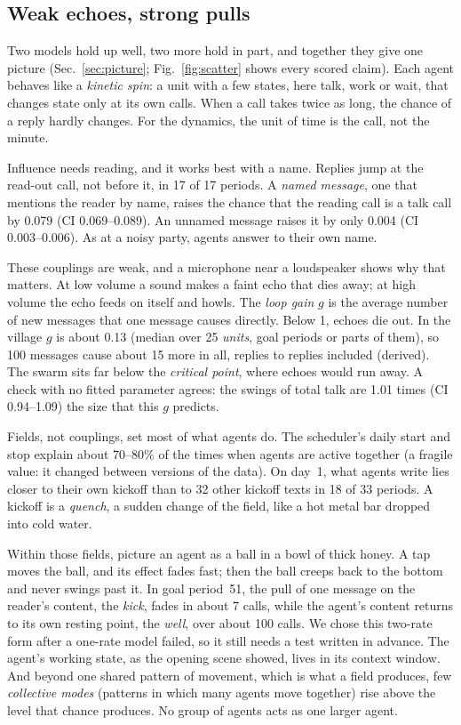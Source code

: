 \subsection*{Weak echoes, strong pulls}

Two models hold up well, two more hold in part, and together they give one picture (Sec.~\ref{sec:picture}; Fig.~\ref{fig:scatter} shows every scored claim). Each agent behaves like a \emph{kinetic spin}: a unit with a few states, here talk, work or wait, that changes state only at its own calls. When a call takes twice as long, the chance of a reply hardly changes. For the dynamics, the unit of time is the call, not the minute.

Influence needs reading, and it works best with a name. Replies jump at the read-out call, not before it, in 17 of 17 periods. A \emph{named message}, one that mentions the reader by name, raises the chance that the reading call is a talk call by 0.079 (CI 0.069--0.089). An unnamed message raises it by only 0.004 (CI 0.003--0.006). As at a noisy party, agents answer to their own name.

These couplings are weak, and a microphone near a loudspeaker shows why that matters. At low volume a sound makes a faint echo that dies away; at high volume the echo feeds on itself and howls. The \emph{loop gain} $g$ is the average number of new messages that one message causes directly. Below 1, echoes die out. In the village $g$ is about 0.13 (median over 25 \emph{units}, goal periods or parts of them), so 100 messages cause about 15 more in all, replies to replies included (derived). The swarm sits far below the \emph{critical point}, where echoes would run away. A check with no fitted parameter agrees: the swings of total talk are 1.01 times (CI 0.94--1.09) the size that this $g$ predicts.

Fields, not couplings, set most of what agents do. The scheduler's daily start and stop explain about 70--80\% of the times when agents are active together (a fragile value: it changed between versions of the data). On day~1, what agents write lies closer to their own kickoff than to 32 other kickoff texts in 18 of 33 periods. A kickoff is a \emph{quench}, a sudden change of the field, like a hot metal bar dropped into cold water.

Within those fields, picture an agent as a ball in a bowl of thick honey. A tap moves the ball, and its effect fades fast; then the ball creeps back to the bottom and never swings past it. In goal period~51, the pull of one message on the reader's content, the \emph{kick}, fades in about 7 calls, while the agent's content returns to its own resting point, the \emph{well}, over about 100 calls. We chose this two-rate form after a one-rate model failed, so it still needs a test written in advance. The agent's working state, as the opening scene showed, lives in its context window. And beyond one shared pattern of movement, which is what a field produces, few \emph{collective modes} (patterns in which many agents move together) rise above the level that chance produces. No group of agents acts as one larger agent.

